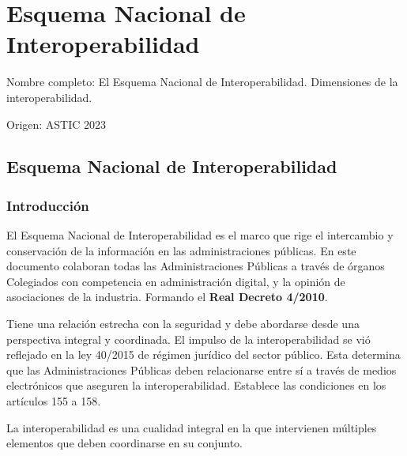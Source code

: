 \setcounter{section}{44}
\section{Esquema Nacional de Interoperabilidad}

Nombre completo: El Esquema Nacional de Interoperabilidad. Dimensiones de la interoperabilidad.

Origen: ASTIC 2023

\localtableofcontents
\newcommand{\ISA}{ISA\textsuperscript{2}}

\subsection{Esquema Nacional de Interoperabilidad} %
    \subsubsection{Introducción} %
        El Esquema Nacional de Interoperabilidad es el marco que rige el intercambio y conservación de la información en las administraciones públicas. En este documento colaboran todas las Administraciones Públicas a través de órganos Colegiados con competencia en administración digital, y la opinión de asociaciones de la industria. Formando el \textbf{Real Decreto 4/2010}.

        Tiene una relación estrecha con la seguridad y debe abordarse desde una perspectiva integral y coordinada. El impulso de la interoperabilidad se vió reflejado en la ley 40/2015 de régimen jurídico del sector público. Esta determina que las Administraciones Públicas deben relacionarse entre sí a través de medios electrónicos que aseguren la interoperabilidad. Establece las condiciones en los artículos 155 a 158.

        La interoperabilidad es una cualidad integral en la que intervienen múltiples elementos que deben coordinarse en su conjunto.

